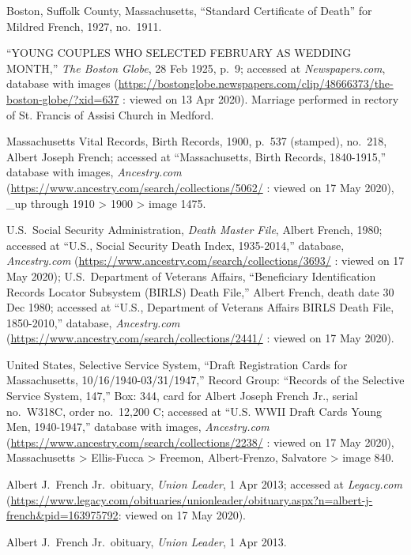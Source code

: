 \begin{thebibliography}{999}
Boston, Suffolk County, Massachusetts, ``Standard Certificate of Death'' for Mildred French, 1927, no.\ 1911.

``YOUNG COUPLES WHO SELECTED FEBRUARY AS WEDDING MONTH,'' \textit{The Boston Globe}, 28 Feb 1925, p.\ 9; accessed at \textit{Newspapers.com}, database with images (\url{https://bostonglobe.newspapers.com/clip/48666373/the-boston-globe/?xid=637} : viewed on 13 Apr 2020). Marriage performed in rectory of St. Francis of Assisi Church in Medford.

Massachusetts Vital Records, Birth Records, 1900, p.\ 537 (stamped), no.\ 218, Albert Joseph French; accessed at ``Massachusetts, Birth Records, 1840-1915,'' database with images, \textit{Ancestry.com} (\url{https://www.ancestry.com/search/collections/5062/} : viewed on 17 May 2020), \_up through 1910 > 1900 > image 1475.

U.S.\ Social Security Administration, \textit{Death Master File}, Albert French, 1980; accessed at ``U.S., Social Security Death Index, 1935-2014,'' database, \textit{Ancestry.com} (\url{https://www.ancestry.com/search/collections/3693/} : viewed on 17 May 2020); U.S.\ Department of Veterans Affairs, ``Beneficiary Identification Records Locator Subsystem (BIRLS) Death File,'' Albert French, death date 30 Dec 1980; accessed at ``U.S., Department of Veterans Affairs BIRLS Death File, 1850-2010,'' database, \textit{Ancestry.com} (\url{https://www.ancestry.com/search/collections/2441/} : viewed on 17 May 2020).

United States, Selective Service System, ``Draft Registration Cards for Massachusetts, 10/16/1940-03/31/1947,'' Record Group: ``Records of the Selective Service System, 147,'' Box: 344, card for Albert Joseph French Jr., serial no.\ W318C, order no.\ 12,200 C; accessed at ``U.S. WWII Draft Cards Young Men, 1940-1947,'' database with images, \textit{Ancestry.com} (\url{https://www.ancestry.com/search/collections/2238/} : viewed on 17 May 2020), Massachusetts > Ellis-Fucca > Freemon, Albert-Frenzo, Salvatore > image 840.

Albert J.\ French Jr.\ obituary, \textit{Union Leader}, 1 Apr 2013; accessed at \textit{Legacy.com} (\url{https://www.legacy.com/obituaries/unionleader/obituary.aspx?n=albert-j-french\&pid=163975792}: viewed on 17 May 2020).

Albert J.\ French Jr.\ obituary, \textit{Union Leader}, 1 Apr 2013.


\end{thebibliography}
